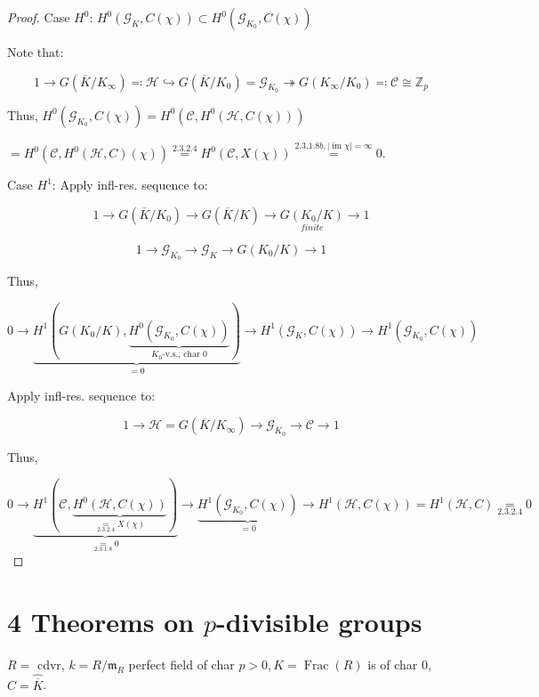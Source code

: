 \documentclass{article}
\theoremstyle{definition}
\numberwithin{theorem}{subsection}
\begin{document}
    \begin{proof}
        Case \(H^0\): \(H^0(\mathscr{G}_K, C(\chi)) \subset H^0(\mathscr{G}_{K_0}, C(\chi))\) 

        Note that:

        \[
            1 \to G(\overline{K} / K_\infty) \eqqcolon \mathscr{H} \hookrightarrow G(\overline{K} / K_0) = \mathscr{G}_{K_0} \twoheadrightarrow G(K_\infty / K_0) \eqqcolon \mathscr{C} \cong \mathbb{Z}_p
        \]

        Thus, \(H^0(\mathscr{G}_{K_0}, C(\chi)) = H^0(\mathscr{C}, H^0(\mathscr{H}, C(\chi)))\)
        
        \( = H^0(\mathscr{C}, H^0(\mathscr{H}, C)(\chi)) \overset{2.3.2.4}{=} H^0(\mathscr{C}, X(\chi)) \overset{2.3.1.8b, \vert \operatorname{im} \chi \vert = \infty}{=} 0\).
        
        Case \(H^1\): Apply infl-res. sequence to:

        \[
            1 \to G(\overline{K}/K_0) \to G(\overline{K} / K) \to \underset{finite}{G(K_0 / K)} \to 1
        \]

        \[
            1 \to \mathscr{G}_{K_0} \to \mathscr{G}_K \to G(K_0 / K) \to 1
        \]

        Thus,

        \[
            0 \to \underbrace{H^1(G(K_0 / K), \underbrace{H^0(\mathscr{G}_{K_0}, C(\chi))}_{K_0 \text{-v.s., char 0}})}_{=0} \to H^1(\mathscr{G}_K, C(\chi)) \to H^1(\mathscr{G}_{K_0}, C(\chi))
        \]

        Apply infl-res. sequence to:

        \[
            1 \to \mathscr{H} = G(\overline{K} / K_\infty) \to \mathscr{G}_{K_0} \to \mathscr{C} \to 1
        \]

        Thus,

        \[
            0 \to \underbrace{H^1(\mathscr{C}, \underbrace{H^0(\mathscr{H}, C(\chi))}_{\underset{2.3.2.4}{=} X(\chi)})}_{\underset{2.3.1.8}{=} 0} \to \underbrace{H^1(\mathscr{G}_{K_0}, C(\chi))}_{=0} \to H^1(\mathscr{H}, C(\chi)) = H^1(\mathscr{H}, C) \underset{2.3.2.4}{=} 0 
        \]
        
    \end{proof}

    \section*{4 Theorems on \(p\)-divisible groups}

    \(R=\) cdvr, \(k = R / \mathfrak{m}_R\) perfect field of char \(p > 0, K = \operatorname{Frac}(R)\) is of char \(0\), \(C = \widehat{\overline{K}}\).
\end{document}
